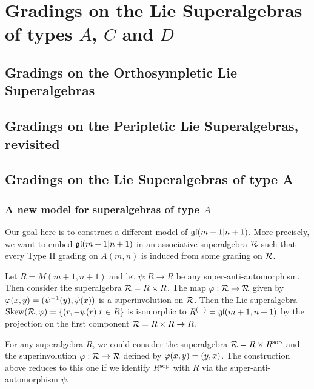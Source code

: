 \chapter{Gradings on the Lie Superalgebras of types $A$, $C$ and $D$}

\section{Gradings on the Orthosympletic Lie Superalgebras}
\section{Gradings on the Peripletic Lie Superalgebras, revisited}
\section{Gradings on the Lie Superalgebras of type A}
\subsection{A new model for superalgebras of type $A$}


Our goal here is to construct a different model of $\mathfrak{gl}(m+1 | n+1)$. More precisely, we want to embed $\mathfrak{gl}(m+1 | n+1)$ in an associative superalgebra $\mathcal R$ such that every Type II grading on $A(m,n)$ is induced from some grading on $\mathcal R$.

Let $R = M(m+1, n+1)$ and let $\psi: R\to R$ be any super-anti-automorphism. Then consider the superalgebra $\mathcal R = R\times R$. The map $\varphi: \mathcal R \to \mathcal R$ given by $\varphi(x,y) = (\psi^{-1}(y), \psi(x))$ is a superinvolution on $\mathcal R$. Then the Lie superalgebra $\operatorname{Skew} (\mathcal R, \varphi) = \{(r, -\psi(r) | r\in R\}$ is isomorphic to $R^{(-)} = \mathfrak{gl}(m+1, n+1)$ by the projection on the first component $\mathcal R = R\times R \to R$.

\begin{remark}
    For any superalgebra $R$, we could consider the superalgebra $\mathcal R = R \times R^{\mathrm{sop}}$ and the superinvolution $\varphi: \mathcal R \to \mathcal R$ defined by $\varphi(x, y) = (y, x)$. The construction above reduces to this one if we identify $R^{\mathrm{sop}}$ with $R$ via the super-anti-automorphism $\psi$. 
\end{remark}

